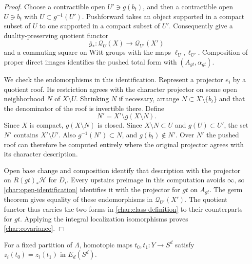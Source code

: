 \begin{proof}
Choose a contractible open $U'\ni g(b_t)$, and then a contractible
open $U\ni b_t$ with $U\subset g^{-1}(U')$.  Pushforward takes an
object supported in a compact subset of $U$ to one supported in a
compact subset of $U'$.  Consequently
 give a
duality-preserving quotient functor
\[
 \overline g_*:\mathcal Q_U(X)\longrightarrow\mathcal Q_{U'}(X')
\]
and a commuting square on Witt groups with the maps $\ell_U,\ell_{U'}$.
Composition of proper direct images identifies the pushed total form
with $(A_{gt},\alpha_{gt})$.

We check the endomorphisms in this identification.  Represent a
projector $e_i$ by a quotient roof.  Its restriction agrees with the
character projector on some open neighborhood $N$ of $X\setminus U$.
Shrinking $N$ if necessary, arrange $N\subset X\setminus\{b_t\}$ and
that the denominator of the roof is invertible there.  Define
\begin{equation}\label{char:covariance-neighborhood}
 N'=X'\setminus g(X\setminus N).
\end{equation}
Since $X$ is compact, $g(X\setminus N)$ is closed.  Since
$X\setminus N\subset U$ and $g(U)\subset U'$, the set $N'$ contains
$X'\setminus U'$.  Also $g^{-1}(N')\subset N$, and
$g(b_t)\notin N'$.  Over $N'$ the pushed roof can therefore be
computed entirely where the original projector agrees with its
character description.

Open base change and composition identify that description with the
projector on $R(gt)_*\mathcal H$ for $D_i$.  Every upstairs preimage
in this computation avoids $\infty$, so
\eqref{char:open-identification} identifies it with the projector for
$gt$ on $A_{gt}$.  The germ theorem gives equality of these
endomorphisms in $\mathcal Q_{U'}(X')$.  The quotient functor thus
carries the two forms in \eqref{char:class-definition} to their
counterparts for $gt$.  Applying the integral localization
isomorphisms proves \eqref{char:covariance}.
\end{proof}

\begin{proposition}\label{prop:class-homotopy}
For a fixed partition of $\Lambda$, homotopic maps
$t_0,t_1:Y\to S^d$ satisfy $z_i(t_0)=z_i(t_1)$ in $E_d(S^d)$.
\end{proposition}

